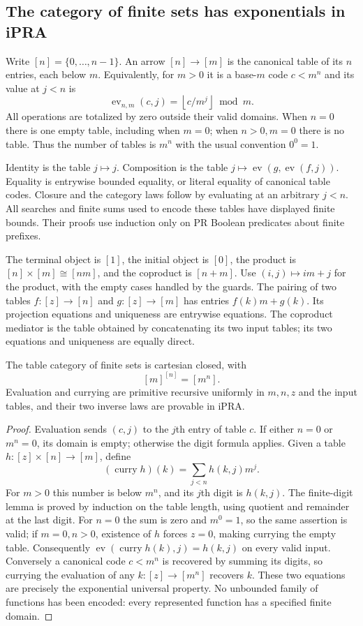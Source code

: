 \subsection{The category of finite sets has exponentials in iPRA}
\label{subsec:finset-exp}

Write $[n]=\{0,\ldots,n-1\}$.  An arrow $[n]\to[m]$ is the canonical table of its
$n$ entries, each below $m$.  Equivalently, for $m>0$ it is a base-$m$ code
$c<m^n$ and its value at $j<n$ is
\[
 \operatorname{ev}_{n,m}(c,j)
 =\left\lfloor c/m^j\right\rfloor\bmod m.
\]
All operations are totalized by zero outside their valid domains.  When $n=0$
there is one empty table, including when $m=0$; when $n>0,m=0$ there is no table.
Thus the number of tables is $m^n$ with the usual convention $0^0=1$.

Identity is the table $j\mapsto j$.  Composition is the table
$j\mapsto\operatorname{ev}(g,\operatorname{ev}(f,j))$.  Equality is entrywise
bounded equality, or literal equality of canonical table codes.  Closure and the
category laws follow by evaluating at an arbitrary $j<n$.  All searches and
finite sums used to encode these tables have displayed finite bounds.  Their
proofs use induction only on PR Boolean predicates about finite prefixes.

The terminal object is $[1]$, the initial object is $[0]$, the product is
$[n]\times[m]\cong[nm]$, and the coproduct is $[n+m]$.  Use
$(i,j)\mapsto im+j$ for the product, with the empty cases handled by the guards.
The pairing of two tables $f:[z]\to[n]$ and $g:[z]\to[m]$ has entries
$f(k)m+g(k)$.  Its projection equations and uniqueness are entrywise equations.
The coproduct mediator is the table obtained by concatenating its two input
tables; its two equations and uniqueness are equally direct.

\begin{theorem}
The table category of finite sets is cartesian closed, with
\[
 [m]^{[n]}=[m^n].
\]
Evaluation and currying are primitive recursive uniformly in $m,n,z$ and the
input tables, and their two inverse laws are provable in iPRA.
\end{theorem}
\begin{proof}
Evaluation sends $(c,j)$ to the $j$th entry of table $c$.  If either $n=0$ or
$m^n=0$, its domain is empty; otherwise the digit formula applies.  Given a table
$h:[z]\times[n]\to[m]$, define
\[
 (\operatorname{curry}h)(k)
   =\sum_{j<n}h(k,j)m^j.
\]
For $m>0$ this number is below $m^n$, and its $j$th digit is $h(k,j)$.  The
finite-digit lemma is proved by induction on the table length, using quotient
and remainder at the last digit.  For $n=0$ the sum is zero and $m^0=1$, so the
same assertion is valid; if $m=0,n>0$, existence of $h$ forces $z=0$, making
currying the empty table.  Consequently
$\operatorname{ev}(\operatorname{curry}h(k),j)=h(k,j)$ on every valid input.
Conversely a canonical code $c<m^n$ is recovered by summing its digits, so
currying the evaluation of any $k:[z]\to[m^n]$ recovers $k$.  These two equations
are precisely the exponential universal property.  No unbounded family of
functions has been encoded: every represented function has a specified finite
domain.
\end{proof}


